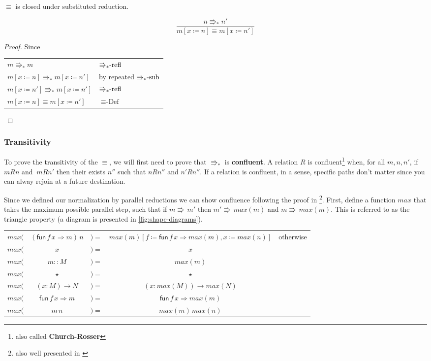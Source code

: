 \begin{cor}
$\equiv$ is closed under substituted reduction.
\end{cor}

\[
\frac{n\Rrightarrow_{\ast}n'}{m\left[x\coloneqq n\right]\equiv m\left[x\coloneqq n'\right]}
\]

\begin{proof}
Since

\begin{tabular}{ll}
$m\Rrightarrow_{\ast}m$ & $\textrm{\ensuremath{\Rrightarrow_{\ast}}-refl}$\tabularnewline
$m\left[x\coloneqq n\right]\Rrightarrow_{\ast}m\left[x\coloneqq n'\right]$ & by repeated $\textrm{\ensuremath{\Rrightarrow_{\ast}}-sub}$\tabularnewline
$m\left[x\coloneqq n'\right]\Rrightarrow_{\ast}m\left[x\coloneqq n'\right]$ & $\textrm{\ensuremath{\Rrightarrow_{\ast}}-refl}$\tabularnewline
$m\left[x\coloneqq n\right]\equiv m\left[x\coloneqq n'\right]$ & $\equiv\textrm{-Def}$\tabularnewline
\end{tabular}
\end{proof}

\subsubsection{Transitivity}

To prove the transitivity of the $\equiv$, we will first need to
prove that \textbf{$\Rrightarrow_{\ast}$ }is \textbf{confluent}.
A relation $R$ is confluent\footnote{also called \textbf{Church-Rosser}}
when, for all $m,n,n'$, if$mRn$ and $\:mRn'$ then their exists
$n''$ such that $nRn''$ and $n'Rn''$. If a relation is confluent,
in a sense, specific paths don't matter since you can alway rejoin
at a future destination.

Since we defined our normalization by parallel reductions we can show
confluence following the proof in \cite{TAKAHASHI1995120}\footnote{also well presented in \cite{KOKKE2020102440}}.
First, define a function $max$ that takes the maximum possible parallel
step, such that if $m\Rrightarrow\,m'$ then $m'\Rrightarrow\,max\left(m\right)$
and $m\Rrightarrow\,max\left(m\right)$. This is referred to as the
triangle property (a diagram is presented in \ref{fig:shape-diagrams}).

\begin{tabular}{ccccc}
$max($ & $\left(\mathsf{fun}\,f\,x\Rightarrow m\right)\,n$ & $)=$ & $max\left(m\right)\left[f\coloneqq\mathsf{fun}\,f\,x\Rightarrow max\left(m\right),x\coloneqq max\left(n\right)\right]$ & otherwise\tabularnewline
$max($ & $x$ & $)=$ & $x$ & \tabularnewline
$max($ & $m::M$ & $)=$ & $max\left(m\right)$ & \tabularnewline
$max($ & $\star$ & $)=$ & $\star$ & \tabularnewline
$max($ & $\left(x:M\right)\rightarrow N$ & $)=$ & $\left(x:max\left(M\right)\right)\rightarrow max\left(N\right)$ & \tabularnewline
$max($ & $\mathsf{fun}\,f\,x\Rightarrow m$ & $)=$ & $\mathsf{fun}\,f\,x\Rightarrow max\left(m\right)$ & \tabularnewline
$max($ & $m\,n$ & $)=$ & $max\left(m\right)\,max\left(n\right)$ & \tabularnewline
\end{tabular}

